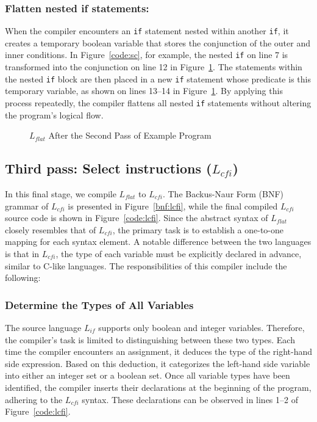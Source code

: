 \subsubsection{Flatten nested if statements:}
When the compiler encounters an \texttt{if} statement nested within another \texttt{if}, it creates a temporary boolean variable that stores the conjunction of the outer and inner conditions. In Figure~\ref{code:sc}, for example, the nested \texttt{if} on line 7 is transformed into the conjunction on line 12 in Figure~\ref{code:flat}. The statements within the nested \texttt{if} block are then placed in a new \texttt{if} statement whose predicate is this temporary variable, as shown on lines 13–14 in Figure~\ref{code:flat}. By applying this process repeatedly, the compiler flattens all nested \texttt{if} statements without altering the program’s logical flow.

\begin{figure}[h!]
	
	\caption{$L_{flat}$ After the Second Pass of Example Program}
	\label{code:flat}
\end{figure}


\subsection{Third pass: Select instructions ($L_{cfi}$)}

In this final stage, we compile $L_{flat}$ to $L_{cfi}$. The Backus-Naur Form (BNF) grammar of $L_{cfi}$ is presented in Figure~\ref{bnf:lcfi}, while the final compiled $L_{cfi}$ source code is shown in Figure~\ref{code:lcfi}. Since the abstract syntax of $L_{flat}$ closely resembles that of $L_{cfi}$, the primary task is to establish a one-to-one mapping for each syntax element. A notable difference between the two languages is that in $L_{cfi}$, the type of each variable must be explicitly declared in advance, similar to C-like languages. The responsibilities of this compiler include the following:

\subsubsection{Determine the Types of All Variables}
The source language $L_{if}$ supports only boolean and integer variables. Therefore, the compiler's task is limited to distinguishing between these two types. Each time the compiler encounters an assignment, it deduces the type of the right-hand side expression. Based on this deduction, it categorizes the left-hand side variable into either an integer set or a boolean set. Once all variable types have been identified, the compiler inserts their declarations at the beginning of the program, adhering to the $L_{cfi}$ syntax. These declarations can be observed in lines 1–2 of Figure~\ref{code:lcfi}.

